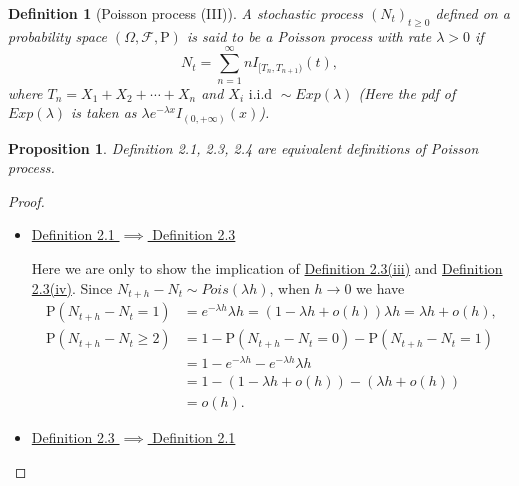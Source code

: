 \documentclass{report}
\newtheorem{definition}{Definition}[section]
\newtheorem{proposition}{Proposition}[section]
\theoremstyle{nonumberplain}
\newtheorem{proof}{Proof.}
\begin{document}
\begin{definition}[Poisson process (III)]
	A stochastic process $(N_t)_{t\ge0}$ defined on a probability space $(\Omega,\mathcal{F},\mathrm{P})$ is said to be a \emph{Poisson process} with rate $\lambda>0$ if
	\[
	N_t=\sum_{n=1}^{\infty}nI_{[T_n,T_{n+1})}(t),
	\]
	where $T_n=X_1+X_2+\cdots+X_n$ and $X_i\text{ i.i.d }\sim Exp(\lambda)$ (Here the pdf of $Exp(\lambda)$ is taken as $\lambda e^{-\lambda x}I_{(0,+\infty)}(x)$).
\end{definition}

\begin{proposition}
	Definition 2.1, 2.3, 2.4 are equivalent definitions of Poisson process.
\end{proposition}
\begin{proof}~\\
	\vspace{-1em}
	\begin{itemize}
	\item \underline{Definition 2.1 $\implies$ Definition 2.3} 
	
	Here we are only to show the implication of \hyperlink{Definition 2.3(iii)}{Definition 2.3(iii)} and \hyperlink{Definition 2.3(iv)}{Definition 2.3(iv)}. Since $N_{t+h}-N_t\sim Pois(\lambda h)$, when $h\to0$ we have 
	\begin{align*}
		\mathrm{P}(N_{t+h}-N_t=1)&=e^{-\lambda h}\lambda h=(1-\lambda h+o(h))\lambda h=\lambda h+o(h),\\
		\mathrm{P}(N_{t+h}-N_t\ge2)&=1-\mathrm{P}(N_{t+h}-N_t=0)-\mathrm{P}(N_{t+h}-N_t=1)\\
		&=1-e^{-\lambda h}-e^{-\lambda h}\lambda h\\
		&=1-(1-\lambda h+o(h))-(\lambda h+o(h))\\
		&=o(h).
	\end{align*}
	\item\underline{Definition 2.3 $\implies$ Definition 2.1} 
	

\end{itemize}
\end{proof}
\end{document}

